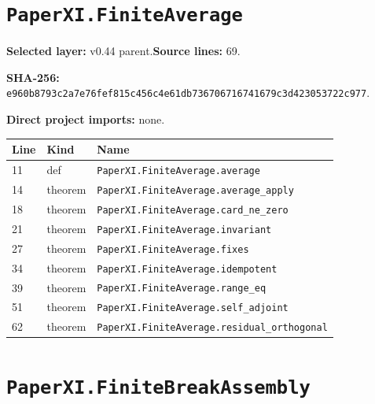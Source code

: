 \documentclass[10pt,oneside]{book}
\begin{document}
\section{\texorpdfstring{\nolinkurl{PaperXI.FiniteAverage}}{PaperXI.FiniteAverage}}\label{module:PaperXI.FiniteAverage}

\textbf{Selected layer:} v0.44 parent.\quad\textbf{Source lines:} 69.\par\textbf{SHA-256:} {\scriptsize\nolinkurl{e960b8793c2a7e76fef815c456c4e61db736706716741679c3d423053722c977}}.


\textbf{Direct project imports:} none.

\begin{longtable}{@{}p{}p{}p{}@{}}\toprule Line&Kind&Name\\\midrule\endhead

11&def&\nolinkurl{PaperXI.FiniteAverage.average}\\

14&theorem&\nolinkurl{PaperXI.FiniteAverage.average_apply}\\

18&theorem&\nolinkurl{PaperXI.FiniteAverage.card_ne_zero}\\

21&theorem&\nolinkurl{PaperXI.FiniteAverage.invariant}\\

27&theorem&\nolinkurl{PaperXI.FiniteAverage.fixes}\\

34&theorem&\nolinkurl{PaperXI.FiniteAverage.idempotent}\\

39&theorem&\nolinkurl{PaperXI.FiniteAverage.range_eq}\\

51&theorem&\nolinkurl{PaperXI.FiniteAverage.self_adjoint}\\

62&theorem&\nolinkurl{PaperXI.FiniteAverage.residual_orthogonal}\\

\bottomrule\end{longtable}

\section{\texorpdfstring{\nolinkurl{PaperXI.FiniteBreakAssembly}}{PaperXI.FiniteBreakAssembly}}\label{module:PaperXI.FiniteBreakAssembly}
\end{document}
